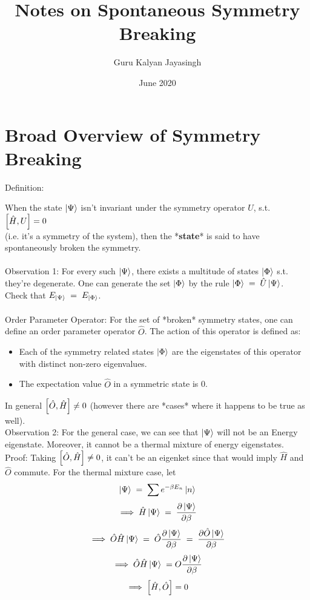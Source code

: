 \documentclass[12pt]{article}
\title{Notes on Spontaneous Symmetry Breaking}
\author{Guru Kalyan Jayasingh}
\date{June 2020}
\begin{document}
\maketitle

\section{Broad Overview of Symmetry Breaking}
Definition:

When the state $\ket{\Psi}$ isn't invariant under the symmetry operator $\hat{U}$, 
s.t. $\comm{\hat{H}}{U}=0$\\(i.e. it's a symmetry of the system), then the *\textbf{state}* is said to have spontaneously broken the symmetry.\\
\\
Observation 1: For every such $\ket{\Psi}$, there exists a multitude of states $\ket{\Phi}$ s.t. they're degenerate. 
One can generate the set {$\ket{\Phi}$} by the rule $\ket{\Phi}\;=\;\hat{U}\ket{\Psi}$.\\
Check that $E_{\ket{\Psi}}\;=\;E_{\ket{\Phi}}$.\\
\\
Order Parameter Operator: For the set of *broken* symmetry states, one can define an order parameter operator $\hat{O}$.
The action of this operator is defined as:
\begin{itemize}
    \item 
        Each of the symmetry related states {$\ket{\Phi}$} are the eigenstates of this operator with distinct non-zero eigenvalues.
    \item The expectation value $\hat{O}$ in a symmetric state is 0. 
\end{itemize}
In general $\comm{\hat{O}}{\hat{H}}\neq 0$ (however there are *cases* where it happens to be true as well).\\
Observation 2: For the general case, we can see that $\ket{\Psi}$ will not be an Energy eigenstate. Moreover, it cannot be a thermal mixture of energy eigenstates.\\
Proof: Taking $\comm{\hat{O}}{\hat{H}}\neq 0$, it can't be an eigenket since that would imply $\hat{H}$ and $\hat{O}$ commute.
For the thermal mixture case, let 
$$\ket{\Psi}\;=\;\sum e^{-\beta E_n }\ket{n}$$
$$\implies \hat{H}\ket{\Psi}\;=\;\pdv{\ket{\Psi}}{\beta}$$
$$\implies \hat{O}\hat{H}\ket{\Psi}\;=\; \hat{O}\pdv{\ket{\Psi}}{\beta}\;=\;\pdv{\hat{O}\ket{\Psi}}{\beta}$$
$$\implies \hat{O}\hat{H}\ket{\Psi}\;= O \pdv{\ket{\Psi}}{\beta} $$
$$\implies \comm{\hat{H}}{\hat{O}}=0$$
\end{document}
